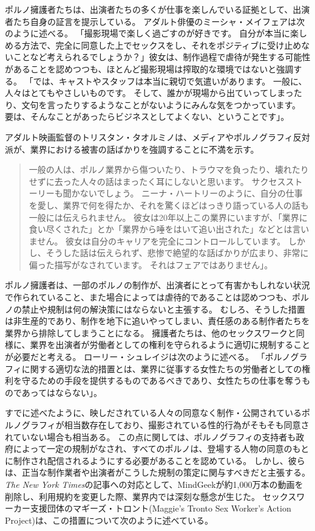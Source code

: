 \documentclass[paper=a4,book,openany]{jlreq} \usepackage{mystyle}
\begin{document}
ポルノ擁護者たちは、出演者たちの多くが仕事を楽しんでいる証拠として、出演者たち自身の証言を提示している。
アダルト俳優のミーシャ・メイフェアは次のように述べる。
「撮影現場で楽しく過ごすのが好きです。
自分が本当に楽しめる方法で、完全に同意した上でセックスをし、それをポジティブに受け止めないことなど考えられるでしょうか？」彼女は、制作過程で虐待が発生する可能性があることを認めつつも、ほとんど撮影現場は搾取的な環境ではないと強調する。
「では、キャストやスタッフは本当に親切で気遣いがあります。
一般に、人々はとてもやさしいものです。
そして、誰かが現場から出ていってしまったり、文句を言ったりするようなことがないようにみんな気をつかっています。
要は、そんなことがあったらビジネスとしてよくない、ということです」\citep{sisley19:_common_myths_porn_debun_porn_perfor}。

アダルト映画監督のトリスタン・タオルミノは、メディアやポルノグラフィ反対派が、業界における被害の話ばかりを強調することに不満を示す。

\begin{quote}
一般の人は、ポルノ業界から傷ついたり、トラウマを負ったり、壊れたりせずに去った人々の話はまったく耳にしないと思います。
サクセスストーリーも聞かないでしょう。
ニーナ・ハートリーのように、自分の仕事を愛し、業界で何を得たか、それを驚くほどはっきり語っている人の話も一般には伝えられません。
彼女は20年以上この業界にいますが、「業界に食い尽くされた」とか「業界から唾をはいて追い出された」などとは言いません。
彼女は自分のキャリアを完全にコントロールしています。
しかし、そうした話は伝えられず、悲惨で絶望的な話ばかりが広まり、非常に偏った描写がなされています。
それはフェアではありません」。
\citep{sachs12:_inter_femin_pornog}
\end{quote}

ポルノ擁護者は、一部のポルノの制作が、出演者にとって有害かもしれない状況で作られていること、また場合によっては虐待的であることは認めつつも、ポルノの禁止や規制は何の解決策にはならないと主張する。
むしろ、そうした措置は非生産的であり、制作を地下に追いやってしまい、責任感のある制作者たちを業界から排除してしまうことになる。
擁護者たちは、他のセックスワークと同様に、業界を出演者が労働者としての権利を守られるように適切に規制することが必要だと考える。
ローリー・シュレイジは次のように述べる。
「ポルノグラフィに関する適切な法的措置とは、業界に従事する女性たちの労働者としての権利を守るための手段を提供するものであるべきであり、女性たちの仕事を奪うものであってはならない」\citep[p.58]{shrage05:_expos_fallac_anti_femin}。

すでに述べたように、映しだされている人々の同意なく制作・公開されているポルノグラフィが相当数存在しており、撮影されている性的行為がそもそも同意されていない場合も相当ある。
この点に関しては、ポルノグラフィの支持者も政府によって一定の規制がなされ、すべてのポルノは、登場する人物の同意のもとに制作され配信されるようにする必要があることを認めている。
しかし、彼らは、正当な制作業者や出演者がこうした規制の策定に関与すべきだと主張する。
\emph{The New York Times}の記事への対応として、MindGeekが約1,000万本の動画を削除し、利用規約を変更した際、業界内では深刻な懸念が生じた。
セックスワーカー支援団体のマギーズ・トロント(Maggie's Tronto Sex Worker's Action Project)は、この措置について次のように述べている。
\end{document}
